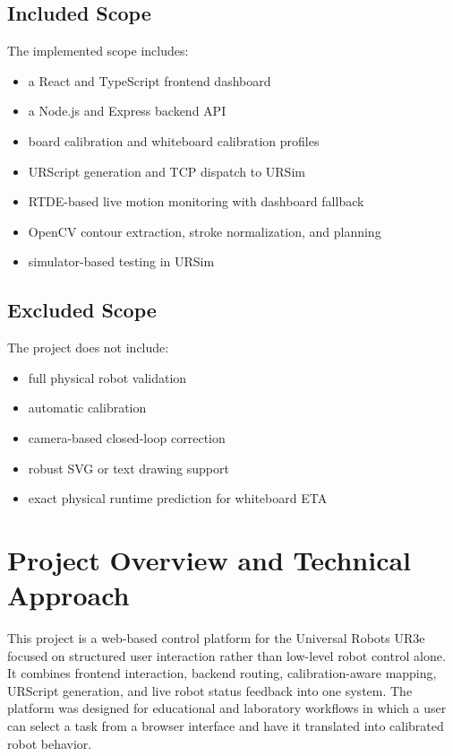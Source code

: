 \documentclass[12pt]{article}
\begin{document}
\subsection{Included Scope}
The implemented scope includes:
\begin{itemize}[leftmargin=*]
\item a React and TypeScript frontend dashboard
\item a Node.js and Express backend API
\item board calibration and whiteboard calibration profiles
\item URScript generation and TCP dispatch to URSim
\item RTDE-based live motion monitoring with dashboard fallback
\item OpenCV contour extraction, stroke normalization, and planning
\item simulator-based testing in URSim
\end{itemize}

\subsection{Excluded Scope}
The project does not include:
\begin{itemize}[leftmargin=*]
\item full physical robot validation
\item automatic calibration
\item camera-based closed-loop correction
\item robust SVG or text drawing support
\item exact physical runtime prediction for whiteboard ETA
\end{itemize}

\section{Project Overview and Technical Approach}
This project is a web-based control platform for the Universal Robots UR3e focused on structured user interaction rather than low-level robot control alone. It combines frontend interaction, backend routing, calibration-aware mapping, URScript generation, and live robot status feedback into one system. The platform was designed for educational and laboratory workflows in which a user can select a task from a browser interface and have it translated into calibrated robot behavior.
\end{document}
